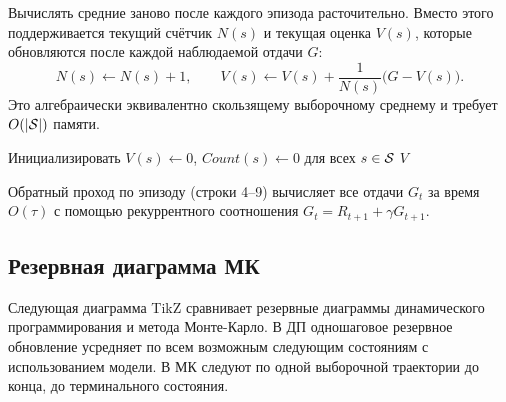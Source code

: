 Вычислять средние заново после каждого эпизода расточительно.  Вместо этого поддерживается текущий счётчик $N(s)$ и текущая оценка $V(s)$, которые обновляются после каждой наблюдаемой отдачи $G$:
\begin{equation}
  \label{eq:mc-incremental}
  N(s) \leftarrow N(s) + 1, \qquad
  V(s) \leftarrow V(s) + \frac{1}{N(s)}\bigl(G - V(s)\bigr).
\end{equation}
Это алгебраически эквивалентно скользящему выборочному среднему и требует $O(|\mathcal{S}|)$ памяти.

\begin{algorithm}[ht]
\caption{Предсказание методом МК по первому посещению}
\label{alg:fv-mc-prediction}
Инициализировать $V(s) \leftarrow 0$, $\mathit{Count}(s) \leftarrow 0$ для всех $s \in \mathcal{S}$\;
\Return $V$\;
\end{algorithm}

Обратный проход по эпизоду (строки 4--9) вычисляет все отдачи $G_t$ за время $O(\tau)$ с помощью рекуррентного соотношения $G_t = R_{t+1} + \gamma G_{t+1}$.

\subsection*{Резервная диаграмма МК}

Следующая диаграмма TikZ сравнивает резервные диаграммы динамического программирования и метода Монте-Карло.  В ДП одношаговое резервное обновление усредняет по всем возможным следующим состояниям с использованием модели.  В МК следуют по одной выборочной траектории до конца, до терминального состояния.

